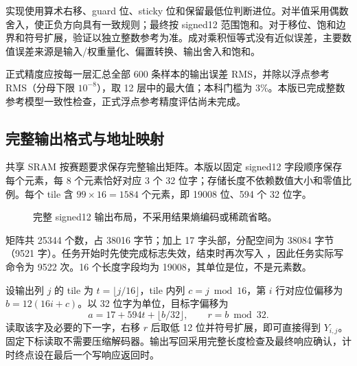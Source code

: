 \documentclass[UTF8,punct,fontset=none,zihao=-4]{ctexart}
\newcommand{\code}[1]{\texttt{\detokenize{#1}}}
\begin{document}
实现使用算术右移、guard 位、sticky 位和保留最低位判断进位。对半值采用偶数舍入，使正负方向具有一致规则；最终按 signed12 范围饱和。对于移位、饱和边界和符号扩展，验证以独立整数参考为准。成对乘积恒等式没有近似误差，主要数值误差来源是输入/权重量化、偏置转换、输出舍入和饱和。

正式精度应按每一层汇总全部 600 条样本的输出误差 RMS，并除以浮点参考 RMS（分母下限 $10^{-8}$），取 12 层中的最大值；本科门槛为 3\%。本版已完成整数参考模型一致性检查，正式浮点参考精度评估尚未完成。



\subsection{完整输出格式与地址映射}
共享 SRAM 按赛题要求保存完整输出矩阵。本版以固定 signed12 字段顺序保存每个元素，每 8 个元素恰好对应 3 个 32 位字；存储长度不依赖数值大小和零值比例。每个 tile 含 $99\times16=1584$ 个元素，即 19008 位、594 个 32 位字。

\begin{figure}[H]\centering
{}
\caption{完整 signed12 输出布局，不采用结果熵编码或稀疏省略。}
\end{figure}

矩阵共 25344 个数，占 38016 字节；加上 17 字头部，分配空间为 38084 字节（9521 字）。任务开始时先使完成标志失效，结束时再次写入 \code{0x32443151}，因此任务实际写命令为 9522 次。16 个长度字段均为 19008，其单位是位，不是元素数。

设输出列 $j$ 的 tile 为 $t=\lfloor j/16\rfloor$，tile 内列 $c=j\bmod16$，第 $i$ 行对应位偏移为 $b=12(16i+c)$。以 32 位字为单位，目标字偏移为
\[
 a=17+594t+\lfloor b/32\rfloor,\qquad r=b\bmod32.
\]
读取该字及必要的下一字，右移 $r$ 后取低 12 位并符号扩展，即可直接得到 $Y_{i,j}$。固定下标读取不需要压缩解码器。输出写回采用完整长度检查及最终响应确认，计时终点设在最后一个写响应返回时。
\end{document}
